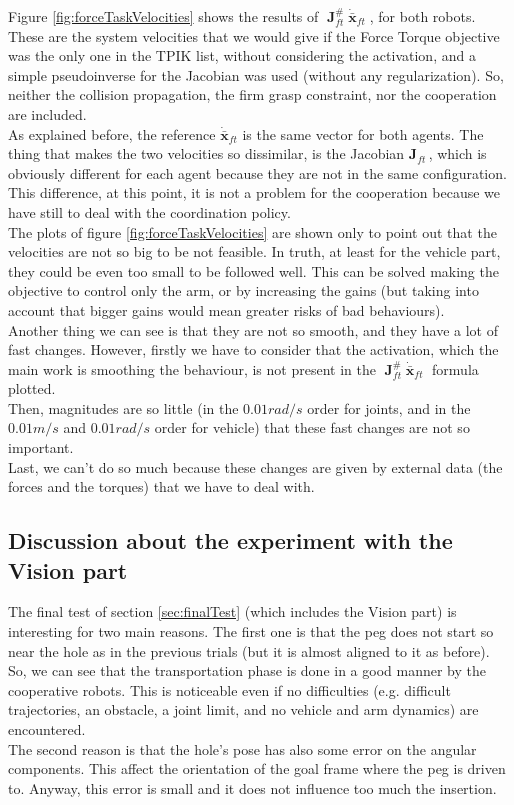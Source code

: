 Figure \ref{fig:forceTaskVelocities} shows the results of $\; \boldsymbol{J}^{\#}_{ft} \; \dot{\bar{\boldsymbol{x}}}_{ft}\;$, for both robots. These are the system velocities that we would give if the Force Torque objective was the only one in the TPIK list, without considering the activation, and a simple pseudoinverse for the Jacobian was used (without any regularization). So, neither the collision propagation, the firm grasp constraint, nor the cooperation are included.\\
As explained before, the reference $\dot{\bar{\boldsymbol{x}}}_{ft}$ is the same vector for both agents. The thing that makes the two velocities so dissimilar, is the Jacobian $\boldsymbol{J}_{ft}\,$, which is obviously different for each agent because they are not in the same configuration. This difference, at this point, it is not a problem for the cooperation because we have still to deal with the coordination policy.\\
 
The plots of figure \ref{fig:forceTaskVelocities} are shown only to point out that the velocities are not so big to be not feasible. In truth, at least for the vehicle part, they could be even too small to be followed well. This can be solved making the objective to control only the arm, or by increasing the gains (but taking into account that bigger gains would mean greater risks of bad behaviours).\\
Another thing we can see is that they are not so smooth, and they have a lot of fast changes. However, firstly we have to consider that the activation, which the main work is smoothing the behaviour, is not present in the $\; \boldsymbol{J}^{\#}_{ft} \; \dot{\bar{\boldsymbol{x}}}_{ft}\;$ formula plotted.\\
Then, magnitudes are so little (in the $0.01rad/s$ order for joints, and in the $0.01m/s$ and $0.01rad/s$ order for vehicle) that these fast changes are not so important.\\
Last, we can't do so much because these changes are given by external data (the forces and the torques) that we have to deal with.\\

\subsection{Discussion about the experiment with the Vision part}
The final test of section \ref{sec:finalTest} (which includes the Vision part) is interesting for two main reasons. The first one is that the peg does not start so near the hole as in the previous trials (but it is almost aligned to it as before). So, we can see that the transportation phase is done in a good manner by the cooperative robots. This is noticeable even if no difficulties (e.g. difficult trajectories, an obstacle, a joint limit, and no vehicle and arm dynamics) are encountered.\\
The second reason is that the hole's pose has also some error on the angular components. This affect the orientation of the goal frame where the peg is driven to. Anyway, this error is small and it does not influence too much the insertion. \\

